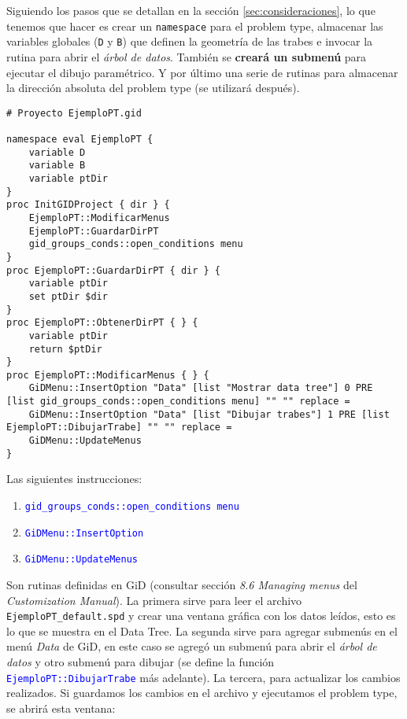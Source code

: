 \documentclass[10pt, a4paper, twocolumn]{article} %
\begin{document}
Siguiendo los pasos que se detallan en la sección \ref{sec:consideraciones}, lo que tenemos que hacer es crear un \texttt{namespace} para el problem type, almacenar las variables globales (\texttt{D} y \texttt{B}) que definen la geometría de las trabes e invocar la rutina para abrir el \textit{árbol de datos}. También se \textbf{creará un submenú} para ejecutar el dibujo paramétrico. Y por último una serie de rutinas para almacenar la dirección absoluta del problem type (se utilizará después).

\lstset{language=tcl} 
\begin{lstlisting}[caption={Código para inicializar el proyecto y crear el menú.}]
# Proyecto EjemploPT.gid

namespace eval EjemploPT {
	variable D
	variable B
	variable ptDir
}
proc InitGIDProject { dir } {
	EjemploPT::ModificarMenus
	EjemploPT::GuardarDirPT
	gid_groups_conds::open_conditions menu
}
proc EjemploPT::GuardarDirPT { dir } {
	variable ptDir
	set ptDir $dir
}
proc EjemploPT::ObtenerDirPT { } {
	variable ptDir
	return $ptDir
}
proc EjemploPT::ModificarMenus { } {
	GiDMenu::InsertOption "Data" [list "Mostrar data tree"] 0 PRE [list gid_groups_conds::open_conditions menu] "" "" replace =
	GiDMenu::InsertOption "Data" [list "Dibujar trabes"] 1 PRE [list EjemploPT::DibujarTrabe] "" "" replace =
    GiDMenu::UpdateMenus
}
\end{lstlisting}

Las siguientes instrucciones:
\begin{enumerate}
	\item \textcolor{blue}{\texttt{gid\_groups\_conds::open\_conditions menu}}
	\item \textcolor{blue}{\texttt{GiDMenu::InsertOption}}
	\item \textcolor{blue}{\texttt{GiDMenu::UpdateMenus}}
\end{enumerate}

Son rutinas definidas en GiD (consultar sección \textit{8.6 Managing menus} del \textit{Customization Manual}). La primera sirve para leer el archivo \texttt{EjemploPT\_default.spd} y crear una ventana gráfica con los datos leídos, esto es lo que se muestra en el Data Tree. La segunda sirve para agregar submenús en el menú \textit{Data} de GiD, en este caso se agregó un submenú para abrir el \textit{árbol de datos} y otro submenú para dibujar (se define la función \textcolor{blue}{\texttt{EjemploPT::DibujarTrabe}} más adelante). La tercera, para actualizar los cambios realizados. Si guardamos los cambios en el archivo y ejecutamos el problem type, se abrirá esta ventana:
\end{document}
